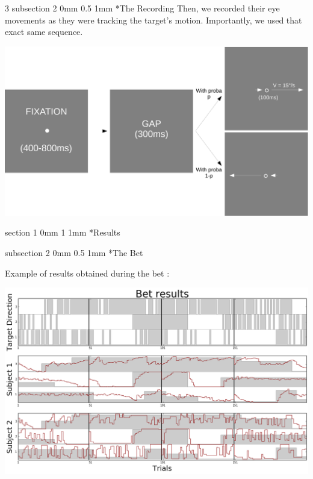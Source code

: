 \documentclass[profile,final,english, draft]{sciposter}%
\makeatletter
\renewcommand{\section}{\@startsection
        {section}%
        {1}%
        {0mm}%
        {1\baselineskip}%
        {1mm}%
        {\LARGE\color{red}\bfseries}}%
\renewcommand{\subsection}{\@startsection
        {subsection}%
        {2}%
        {0mm}%
        {0.5\baselineskip}%
        {1mm}%
        {\normalsize\color[rgb]{0.4,0,0}\bfseries}}%
\makeatother
\begin{document}
\begin{multicols}{3}
\subsection*{The Recording}
Then, we recorded their eye movements as they were tracking the target's motion. Importantly, we used that exact same sequence.
\begin{center} 
    \includegraphics[width=1\columnwidth]{materiel_recording}
\end{center}

\columnbreak

\section*{Results}

\subsection*{The Bet}

Example of results obtained during the bet :

\begin{center} 
    \includegraphics[width=1\columnwidth]{results_pari}
\end{center}


\end{multicols}
\end{document}
